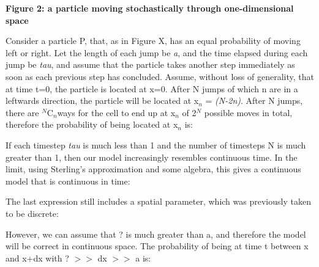 \documentclass[12pt,a4paper]{report}
\begin{document}
\begin{figure}[H]
\centering
\end{figure}


{\bfseries Figure 2: a particle moving stochastically through 
one-dimensional space}



Consider a particle P, that, as in Figure X, has an equal probability of 
moving left or right. Let the length of each jump be {\itshape a}, and 
the time elapsed during each jump be {\itshape tau}, and assume that 
the particle takes another step immediately as soon as each previous 
step has concluded. Assume, without loss of generality, that at time 
t=0, the particle is located at x=0. After N jumps of which n are in a 
leftwards direction, the particle will be located at x$_{n}$ = 
{\itshape (N-2n)}. After N jumps, there are $^{N}$C$_{n }$ways 
for the cell to end up at x$_{n}$ of 2$^{N}$ possible moves in 
total, therefore the probability of being located at x$_{n}$ is:



\begin{figure}[H]
\centering
\end{figure}


If each timestep {\itshape tau} is much less than 1 and the number of 
timesteps N is much greater than 1, then our model increasingly 
resembles continuous time. In the limit, using Sterling's approximation 
and some algebra, this gives a continuous model that is continuous in 
time:

\begin{figure}[H]
\centering
\end{figure}




The last expression still includes a spatial parameter, which was 
previously taken to be discrete: 

\begin{figure}[H]
\centering
\end{figure}




However, we can assume that ? is much greater than a, and therefore the 
model will be correct in continuous space. The probability of being at 
time t between x and x+dx with ? $>$$>$ dx $>$$>$ a is:
\end{document}
